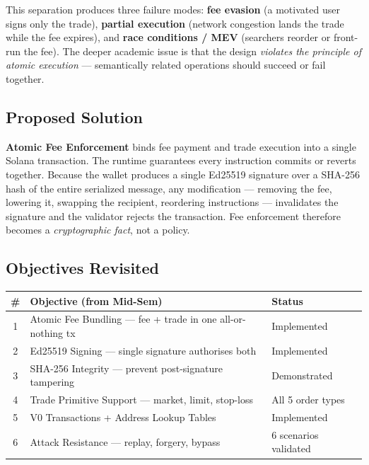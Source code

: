 \documentclass[11pt,a4paper]{article}
\begin{document}
This separation produces three failure modes: \textbf{fee evasion} (a motivated user signs only the trade), \textbf{partial execution} (network congestion lands the trade while the fee expires), and \textbf{race conditions / MEV} (searchers reorder or front-run the fee). The deeper academic issue is that the design \textit{violates the principle of atomic execution} --- semantically related operations should succeed or fail together.

\subsection{Proposed Solution}

\textbf{Atomic Fee Enforcement} binds fee payment and trade execution into a single Solana transaction. The runtime guarantees every instruction commits or reverts together. Because the wallet produces a single Ed25519 signature over a SHA-256 hash of the entire serialized message, any modification --- removing the fee, lowering it, swapping the recipient, reordering instructions --- invalidates the signature and the validator rejects the transaction. Fee enforcement therefore becomes a \textit{cryptographic fact}, not a policy.

\subsection{Objectives Revisited}

\begin{center}
\begin{tabular}{c p{} l}
\toprule
\textbf{\#} & \textbf{Objective (from Mid-Sem)} & \textbf{Status} \\
\midrule
1 & Atomic Fee Bundling --- fee + trade in one all-or-nothing tx & Implemented \\
2 & Ed25519 Signing --- single signature authorises both & Implemented \\
3 & SHA-256 Integrity --- prevent post-signature tampering & Demonstrated \\
4 & Trade Primitive Support --- market, limit, stop-loss & All 5 order types \\
5 & V0 Transactions + Address Lookup Tables & Implemented \\
6 & Attack Resistance --- replay, forgery, bypass & 6 scenarios validated \\
\bottomrule
\end{tabular}
\end{center}
\end{document}
